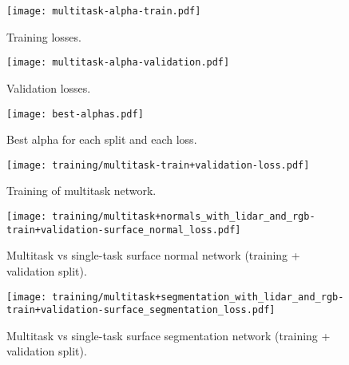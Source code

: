 \begin{figure}[H]
  \texttt{[image: multitask-alpha-train.pdf]}
  \caption{Training losses.}
\end{figure}

\begin{figure}[H]
  \texttt{[image: multitask-alpha-validation.pdf]}
  \caption{Validation losses.}
\end{figure}

\begin{figure}[H]
  \texttt{[image: best-alphas.pdf]}
  \caption{Best alpha for each split and each loss.}
\end{figure}

\begin{figure}[H]
  \texttt{[image: training/multitask-train+validation-loss.pdf]}
  \caption{Training of multitask network.}
\end{figure}

\begin{figure}[H]
  \texttt{[image: training/multitask+normals\_with\_lidar\_and\_rgb-train+validation-surface\_normal\_loss.pdf]}
  \caption{Multitask vs single-task surface normal network (training + validation split).}
\end{figure}

\begin{figure}[H]
  \texttt{[image: training/multitask+segmentation\_with\_lidar\_and\_rgb-train+validation-surface\_segmentation\_loss.pdf]}
  \caption{Multitask vs single-task surface segmentation network (training + validation split).}
\end{figure}
